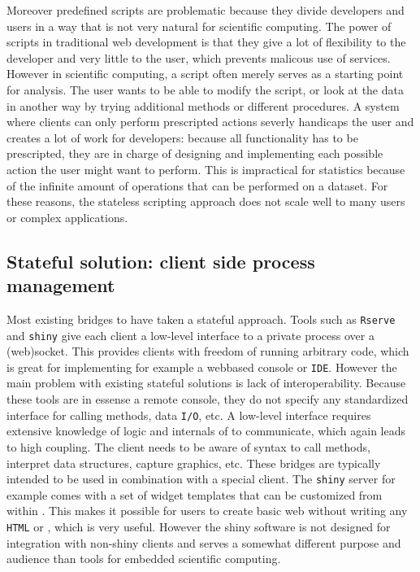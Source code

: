 Moreover predefined scripts are problematic because they divide developers and users in a way that is not very natural for scientific computing. The power of scripts in traditional web development is that they give a lot of flexibility to the developer and very little to the user, which prevents malicous use of services. However in scientific computing, a script often  merely serves as a starting point for analysis. The user wants to be able to modify the script, or look at the data in another way by trying additional methods or different procedures. A system where clients can only perform prescripted actions severly handicaps the user and creates a lot of work for developers: because all functionality has to be prescripted, they are in charge of designing and implementing each possible action the user might want to perform. This is impractical for statistics because of the infinite amount of operations that can be performed on a dataset. For these reasons, the stateless scripting approach does not scale well to many users or complex applications.

\subsection{Stateful solution: client side process management}

Most existing bridges to \R have taken a stateful approach. Tools such as \texttt{Rserve} \citep{urbanek2013rserve} and \texttt{shiny} \citep{shiny} give each client a low-level interface to a private \R process over a (web)socket. This provides clients with freedom of running arbitrary \R code, which is great for implementing for example a webbased console or \texttt{IDE}. However the main problem with existing stateful solutions is lack of interoperability. Because these tools are in essense a remote \R console, they do not specify any standardized interface for calling methods, data \texttt{I/O}, etc. A low-level interface requires extensive knowledge of logic and internals of \R to communicate, which again leads to high coupling. The client needs to be aware of \R syntax to call \R methods, interpret \R data structures, capture graphics, etc. These bridges are typically intended to be used in combination with a special client. The \texttt{shiny} server for example comes with a set of widget templates that can be customized from within \R. 
This makes it possible for \R users to create basic web \GUI without writing any \texttt{HTML} or \JavaScript, which is very useful.
However the shiny software is not designed for integration with non-shiny clients and serves a somewhat different purpose and audience than tools for embedded scientific computing.

